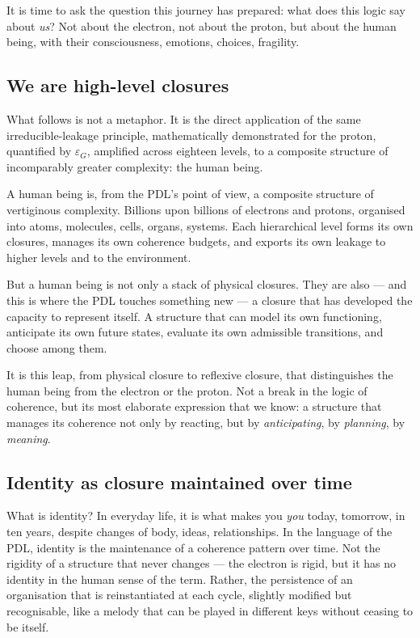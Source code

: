\documentclass[11pt, a4paper, openright]{book}
\begin{document}
\medskip

It is time to ask the question this journey has prepared: what does this logic say about \emph{us}? Not about the electron, not about the proton, but about the human being, with their consciousness, emotions, choices, fragility.

\subsection*{We are high-level closures}

What follows is not a metaphor. It is the direct application of the same irreducible-leakage principle, mathematically demonstrated for the proton, quantified by $\varepsilon_G$, amplified across eighteen levels, to a composite structure of incomparably greater complexity: the human being.

\medskip

A human being is, from the PDL’s point of view, a composite structure of vertiginous complexity. Billions upon billions of electrons and protons, organised into atoms, molecules, cells, organs, systems. Each hierarchical level forms its own closures, manages its own coherence budgets, and exports its own leakage to higher levels and to the environment.

\medskip

But a human being is not only a stack of physical closures. They are also — and this is where the PDL touches something new — a closure that has developed the capacity to represent itself. A structure that can model its own functioning, anticipate its own future states, evaluate its own admissible transitions, and choose among them.

\medskip

It is this leap, from physical closure to reflexive closure, that distinguishes the human being from the electron or the proton. Not a break in the logic of coherence, but its most elaborate expression that we know: a structure that manages its coherence not only by reacting, but by \emph{anticipating}, by \emph{planning}, by \emph{meaning}.

\subsection*{Identity as closure maintained over time}

What is identity? In everyday life, it is what makes you \emph{you} today, tomorrow, in ten years, despite changes of body, ideas, relationships. In the language of the PDL, identity is the maintenance of a coherence pattern over time. Not the rigidity of a structure that never changes — the electron is rigid, but it has no identity in the human sense of the term. Rather, the persistence of an organisation that is reinstantiated at each cycle, slightly modified but recognisable, like a melody that can be played in different keys without ceasing to be itself.
\end{document}
